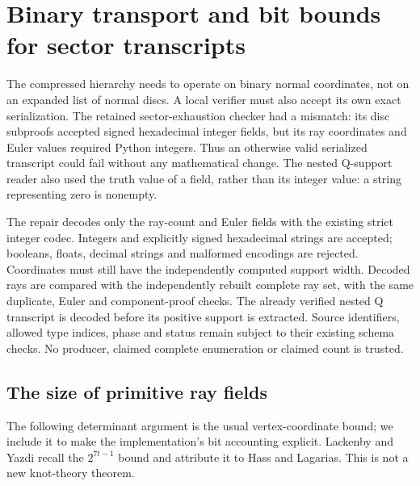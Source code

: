 \section{Binary transport and bit bounds for sector transcripts}
\label{sec:sector-integer-transport}

The compressed hierarchy needs to operate on binary normal coordinates,
not on an expanded list of normal discs. A local verifier must also accept
its own exact serialization. The retained sector-exhaustion checker had a
mismatch: its disc subproofs accepted signed hexadecimal integer fields,
but its ray coordinates and Euler values required Python integers. Thus an
otherwise valid serialized transcript could fail without any mathematical
change. The nested Q-support reader also used the truth value of a field,
rather than its integer value: a string representing zero is nonempty.

The repair decodes only the ray-count and Euler fields with the existing
strict integer codec. Integers and explicitly signed hexadecimal strings
are accepted; booleans, floats, decimal strings and malformed encodings
are rejected. Coordinates must still have the independently computed
support width. Decoded rays are compared with the independently rebuilt
complete ray set, with the same duplicate, Euler and component-proof
checks. The already verified nested Q transcript is decoded before its
positive support is extracted. Source identifiers, allowed type indices,
phase and status remain subject to their existing schema checks.
No producer, claimed complete enumeration or claimed count is trusted.

\subsection{The size of primitive ray fields}

The following determinant argument is the usual vertex-coordinate bound;
we include it to make the implementation's bit accounting explicit.
Lackenby and Yazdi recall the $2^{7t-1}$ bound and attribute it to Hass
and Lagarias\cite[Section 2.7]{lackenby-yazdi-genus}.
This is not a new knot-theory theorem.

